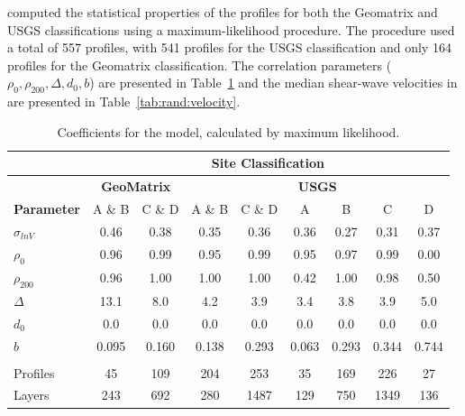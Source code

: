 \documentclass[12pt,oneside]{book}
\begin{document}
\citet{toro:95} computed the statistical properties of the profiles for both the Geomatrix and USGS
classifications using a maximum-likelihood procedure.  The procedure used a total of 557 profiles,
with 541 profiles for the USGS classification and only 164 profiles for the Geomatrix
classification.  The correlation parameters ($\rho_0, \rho_{200}, \Delta, d_0, b$) are presented in
Table~\ref{tab:rand:coeffs} and the median shear-wave velocities in are presented in
Table~\ref{tab:rand:velocity}.

\begin{table}[tbp]
    \centering
    \begin{tabular}{lcc|cccccc}
        \hline\hline
        & \multicolumn{8}{c}{\textbf{Site Classification}} \\
        \hline
        & \multicolumn{2}{c|}{\textbf{GeoMatrix}} 
        & \multicolumn{6}{c}{\textbf{USGS}} \\
        \textbf{Parameter} & A \& B & C \& D & A \& B & C \& D &
        A & B & C & D  \\
        \hline
        $\sigma_{ln V}$ & 0.46 & 0.38 & 0.35 & 0.36 & 0.36 & 0.27 & 0.31 & 0.37 \\
        $\rho_0$  & 0.96 & 0.99 & 0.95 & 0.99 & 0.95 & 0.97 & 0.99 & 0.00 \\
        $\rho_{200}$  & 0.96 & 1.00 & 1.00 & 1.00 & 0.42 & 1.00 & 0.98 & 0.50 \\
        $\Delta$  & 13.1 & 8.0 & 4.2 & 3.9 & 3.4 & 3.8 & 3.9 & 5.0 \\
        $d_0$  &  0.0 & 0.0 & 0.0 & 0.0 & 0.0 & 0.0 & 0.0 & 0.0 \\
        $b$  & 0.095 & 0.160 & 0.138 & 0.293 & 0.063 & 0.293 & 0.344 & 0.744 \\
        \\
        Profiles  & 45  & 109 & 204 & 253   & 35  & 169 & 226  & 27 \\
        Layers  & 243 & 692 & 280 & 1487  & 129 & 750 & 1349 & 136 \\
        \hline\hline
    \end{tabular}
    \caption{Coefficients for the \citet{toro:95} model, calculated by maximum likelihood.}
    \label{tab:rand:coeffs}
\end{table}
\end{document}
